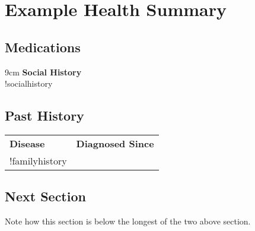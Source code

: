 \documentclass[12pt]{article}
\begin{document}
\section*{Example Health Summary}

\noindent
\begin{minipage}[t]{0.5\linewidth}

\subsection*{Medications}
\begin{tabular}{9cm}
{\bf Social History} \\
!socialhistory  \\
\end{tabular}
\end{minipage}
\begin{minipage}[t]{0.1\linewidth}

\subsection*{Past History}
\vspace{-1mm}
\begin{tabular}{ll}
{\bf Disease} & {\bf Diagnosed Since }\\
!familyhistory & \\
\end{tabular}

\end{minipage}

\subsection*{Next Section}

Note how this section is below the longest
of the two above section.
\end{document}
